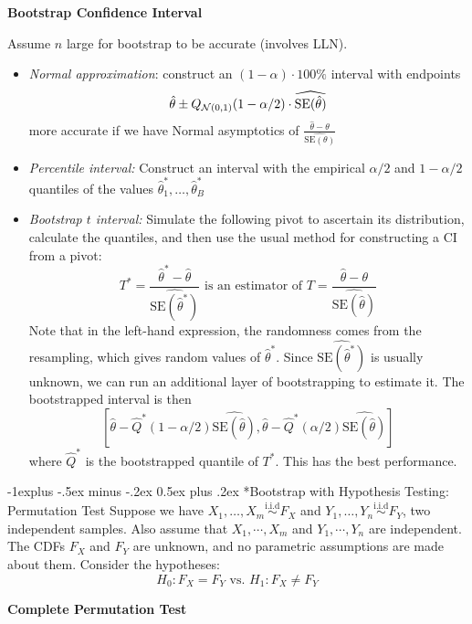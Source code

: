 \documentclass[10pt,landscape]{article}
\makeatletter
\renewcommand{\subsection}{\@startsection{subsection}{2}{0mm}%
                                {-1explus -.5ex minus -.2ex}%
                                {0.5ex plus .2ex}%
                                {\normalfont\normalsize\bfseries}}
\makeatother
\begin{document}
\begin{multicols*}{3}
\textbf{Bootstrap Confidence Interval}

Assume $n$ large for bootstrap to be accurate (involves LLN).
\begin{itemize}
    \item \textit{Normal approximation}: construct an $(1 -\alpha) \cdot 100\%$ interval with endpoints $$\hat\theta \pm Q_{\mathcal{N}(0,1)}(1-\alpha/2)\cdot \widehat{\text{SE} (\hat{\theta})} $$
    more accurate if we have Normal asymptotics of $\frac{\hat{\theta}-\theta}{\widehat{\text{SE}(\theta)}}$
    \item \textit{Percentile interval: } Construct an interval with the empirical $\alpha/2$ and $1-\alpha/2$ quantiles of the values $\hat\theta_1^* , \ldots, \hat\theta_B^*$
    \item \textit{Bootstrap $t$ interval:} Simulate the following pivot to ascertain its distribution, calculate the quantiles, and then use the usual method for constructing a CI from a pivot:
    $$T^*=\frac{\hat{\theta}^* - \hat{\theta}}{\widehat{\text{SE}(\hat{\theta}^*)}} \text{ is an estimator of } T=\frac{\hat{\theta}-\theta}{\widehat{\text{SE}(\hat{\theta})}}$$
    Note that in the left-hand expression, the randomness comes from the resampling,
    which gives random values of $\hat{\theta}^*$. Since $\widehat{\text{SE}(\hat\theta^*)}$ is usually unknown, we can run an additional layer of bootstrapping to estimate it. The bootstrapped interval is then
    $$
    \left[\hat\theta-\hat Q^*(1-\alpha/2)\widehat{\text{SE}(\hat\theta)},\hat\theta-\hat Q^*(\alpha/2)\widehat{\text{SE}(\hat\theta)}\right]
    $$
    where $\hat Q^*$ is the bootstrapped quantile of $T^*$. This has the best performance.
\end{itemize}


\subsection*{Bootstrap with Hypothesis Testing: Permutation Test}
Suppose we have $X_1, \ldots, X_m \stackrel{\text{i.i.d}}{\sim} F_X$ and $Y_1, \ldots, Y_n \stackrel{\text {i.i.d}}{\sim} F_Y$, two independent samples. Also assume that $X_1, \cdots ,X_m$ and $Y_1, \cdots , Y_n$ are independent. The CDFs $F_X$ and $F_Y$ are unknown, and no parametric assumptions are made about them. Consider the hypotheses:
$$
H_0: F_X=F_Y \text { vs. } H_1: F_X \neq F_Y
$$

\textbf{Complete Permutation Test}


\end{multicols*}
\end{document}
